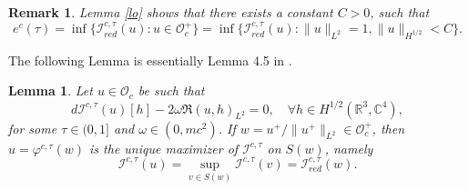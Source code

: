 \documentclass{amsart}
\theoremstyle{plain}
\newtheorem{lemma}[theorem]{Lemma}
\newtheorem{remark}[theorem]{Remark}
\theoremstyle{definition}
\theoremstyle{remark}
\numberwithin{equation}{section} \numberwithin{figure}{section}
\begin{document}
\begin{remark}
   Lemma \ref{lo} shows that there exists a constant  $C>0$, such that
   $$
   e^c(\tau)= \inf \{\mathcal{I }_{red}^{c,\tau}(u): u\in \mathcal{O}_c^+ \}
   =\inf \{\mathcal{I }_{red}^{c,\tau}(u): \|u\|_{L^2}=1, \|u\|_{H^{1/2}} < C \}.
   $$
\end{remark}
The following Lemma is essentially Lemma 4.5  in \cite{Nolasco}.
\begin{lemma}\label{lemm:3.1*}
  Let ${u} \in \mathcal{O}_c$ be such that
 $$
 d \mathcal{I}^{c, \tau}({u})[h]-2 \omega \Re({u}, h)_{L^2}=0, \quad \forall h \in   H^{1/2}(\mathbb{R}^3,\mathbb{C}^4),
 $$
 for some $\tau \in(0,1]$ and $\omega \in(0,mc^2)$. If  $w=u^+ / \|u^+\|_{L^2} \in \mathcal{O}_c^{+}$, then $u=\varphi^{c,\tau}(w)$ is the unique  maximizer of $\mathcal{I}^{c, \tau}$ on $S(w)$, namely
 $$
 \mathcal{I}^{c, \tau}({u})=\sup _{{v} \in S(w)} \mathcal{I}^{c, \tau}({v})=\mathcal{I }_{red}^{c,\tau}(w).
 $$
 \end{lemma}
\end{document}
